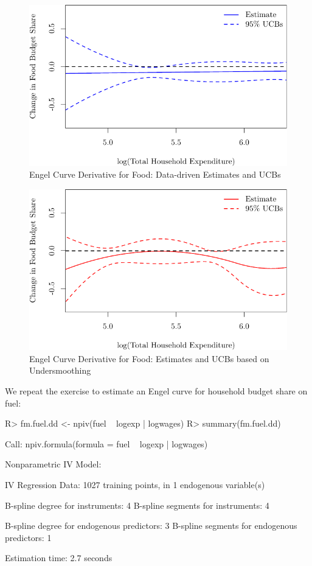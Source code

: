 \documentclass[
]{jss}
\begin{document}
\begin{figure}
\centering
\includegraphics{npiv_files/figure-latex/food-dd-deriv-1.pdf}
\caption{Engel Curve Derivative for Food: Data-driven Estimates and
UCBs}
\end{figure}

\begin{figure}
\centering
\includegraphics{npiv_files/figure-latex/food-det-deriv-1.pdf}
\caption{Engel Curve Derivative for Food: Estimates and UCBs based on
Undersmoothing}
\end{figure}

We repeat the exercise to estimate an Engel curve for household budget
share on fuel:

\begin{CodeChunk}
\begin{CodeInput}
R> fm.fuel.dd <- npiv(fuel ~ logexp | logwages)
R> summary(fm.fuel.dd)
\end{CodeInput}
\begin{CodeOutput}
Call:
npiv.formula(formula = fuel ~ logexp | logwages)

Nonparametric IV Model:

IV Regression Data: 1027 training points, in 1 endogenous variable(s)

B-spline degree for instruments:             4
B-spline segments for instruments:           4

B-spline degree for endogenous predictors:   3
B-spline segments for endogenous predictors: 1

Estimation time: 2.7 seconds
\end{CodeOutput}
\end{CodeChunk}
\end{document}
